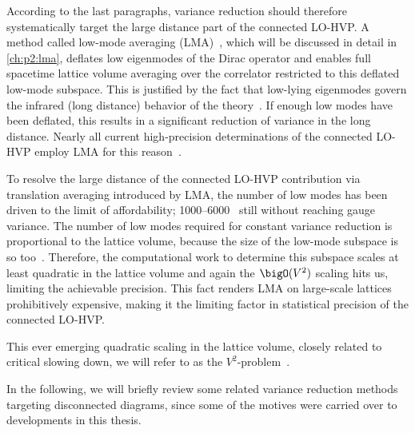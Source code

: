 According to the last paragraphs, variance reduction should therefore systematically target the large distance part of the connected LO-HVP.
A method called low-mode averaging (LMA)~\cite{Neff_2001,DeGrand_2004,Giusti_2004}, which will be discussed in detail in \cref{ch:p2:lma}, deflates low eigenmodes of the Dirac operator and enables full spacetime lattice volume averaging over the correlator restricted to this deflated low-mode subspace.
This is justified by the fact that low-lying eigenmodes govern the infrared (long distance) behavior of the theory~\cite{DeGrand_2004}.
If enough low modes have been deflated, this results in a significant reduction of variance in the long distance.
Nearly all current high-precision determinations of the connected LO-HVP employ LMA for this reason~\cite{snowmass:2025,PhysRevLett.121.022003,bmw_2021,PhysRevD.101.074515,PhysRevD.107.034513,Aubin:2022hgm,ExtendedTwistedMass:2022jpw,PhysRevD.108.054507,bmw_2024,Spiegel:2024dec,PhysRevLett.134.201901,Djukanovic:2024cmq,milc_gm2,FermilabLatticeHPQCD:2024ppc}.

To resolve the large distance of the connected LO-HVP contribution via translation averaging introduced by LMA, the number of low modes has been driven to the limit of affordability; \numrange{1000}{6000}~\cite{Djukanovic:2024cmq,RBC_2024,bmw_2024,Aubin:2022hgm} still without reaching gauge variance.
The number of low modes required for constant variance reduction is proportional to the lattice volume, because the size of the low-mode subspace is so too~\cite{banks1980}.
Therefore, the computational work to determine this subspace scales at least quadratic in the lattice volume and again the $\bigO(V^{2})$ scaling hits us, limiting the achievable precision.
This fact renders LMA on large-scale lattices prohibitively expensive, making it the limiting factor in statistical precision of the connected LO-HVP.

This ever emerging quadratic scaling in the lattice volume, closely related to critical slowing down, we will refer to as the $V^{2}$-problem~\cite{Luescher2007}.

In the following, we will briefly review some related variance reduction methods targeting disconnected diagrams, since some of the motives were carried over to developments in this thesis.

